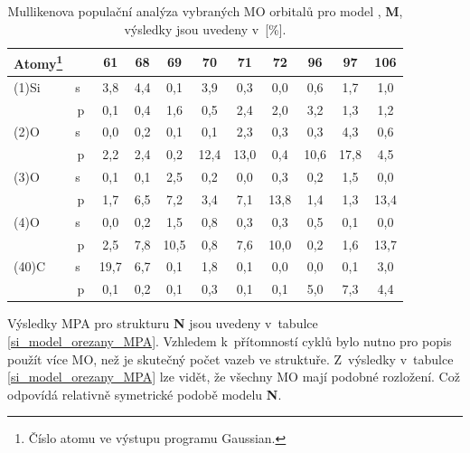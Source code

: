 \documentclass[
digital, %
table,   %
nolof,     %
nolot,     %
oneside,
]{fithesis3}
\begin{document}
\begin{table}[H]\begin{minipage}{\textwidth}
\caption{Mullikenova populační analýza vybraných MO orbitalů pro model , \textbf{M}, výsledky jsou uvedeny v~[\%].}
\begin{center}
\begin{tabular}{|l|c|c|c|c|c|c|c|c|c|c|}
\hline
Atomy\footnote{Číslo atomu ve výstupu programu Gaussian.}   \label{si_model_methyl_MPA_I}  &  & 61 & 68 & 69 & 70 & 71 & 72 & 96 & 97 & 106 \\ \hline
(1)Si  & s~& 3,8  & 4,4 &  0,1  & 3,9  & 0,3  & 0,0  & 0,6  & 1,7  & 1,0  \\ \hline
& p & 0,1  & 0,4& 1,6  & 0,5  & 2,4  & 2,0  & 3,2  & 1,3  & 1,2  \\ \hline
(2)O & s~& 0,0  & 0,2& 0,1  & 0,1  & 2,3  & 0,3  & 0,3  & 4,3  & 0,6  \\ \hline
& p & 2,2  & 2,4& 0,2  & 12,4  & 13,0  & 0,4  & 10,6  & 17,8  & 4,5  \\ \hline
(3)O & s~& 0,1  & 0,1& 2,5  & 0,2  & 0,0  & 0,3  & 0,2  & 1,5  & 0,0  \\ \hline
& p & 1,7  & 6,5 &7,2  & 3,4  & 7,1  & 13,8  & 1,4  & 1,3  & 13,4  \\ \hline
(4)O & s~& 0,0  & 0,2& 1,5  & 0,8  & 0,3  & 0,3  & 0,5  & 0,1  & 0,0  \\ \hline
& p & 2,5  & 7,8& 10,5  & 0,8  & 7,6  & 10,0  & 0,2  & 1,6  & 13,7  \\ \hline
(40)C & s~& 19,7  & 6,7& 0,1  & 1,8  & 0,1  & 0,0  & 0,0  & 0,1  & 3,0  \\ \hline
& p & 0,1  & 0,2& 0,1  & 0,3  & 0,1  & 0,1  & 5,0  & 7,3  & 4,4  \\ \hline
\end{tabular}
\end{center}\end{minipage}\end{table}

Výsledky MPA pro strukturu \textbf{N} jsou uvedeny v~tabulce \ref{si_model_orezany_MPA}. Vzhledem k~přítomností cyklů bylo nutno pro popis použít více MO, než je skutečný počet vazeb ve struktuře. Z~výsledky v~tabulce \ref{si_model_orezany_MPA} lze vidět, že všechny MO mají podobné rozložení. Což odpovídá relativně symetrické podobě modelu \textbf{N}.
\end{document}
